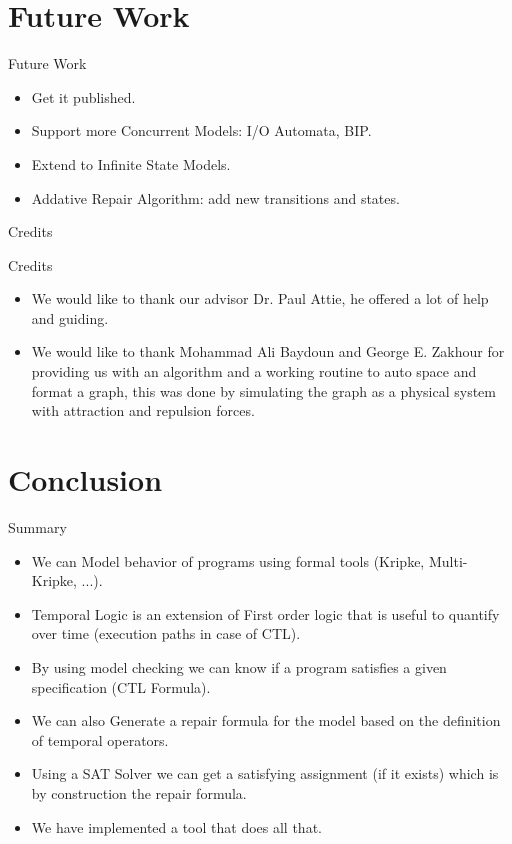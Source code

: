 \documentclass{bredelebeamer}
\begin{document}
\section{Future Work} %

\begin{frame}{Future Work}
\vspace{-5mm}
\hspace{-5mm}
\begin{itemize}
\item Get it published.
\item Support more Concurrent Models: I/O Automata, BIP.
\item Extend to Infinite State Models.
\item Addative Repair Algorithm: add new transitions and states.
\end{itemize}
\end{frame}

\begin{frame}{Credits}
\begin{block}{Credits}
\begin{itemize}
\item We would like to thank our advisor Dr. Paul Attie, he offered a lot of help and guiding.
\item We would like to thank Mohammad Ali Baydoun and George E. Zakhour for providing us with an algorithm 
and a working routine to auto space and format a graph, this was done by simulating the graph as a physical 
system with attraction and repulsion forces.
\end{itemize}
\end{block}
\end{frame}

\section{Conclusion} %

\begin{frame}{Summary}
\vspace{-5mm}
\hspace{-5mm}
\begin{itemize}
\item We can Model behavior of programs using formal tools (Kripke, Multi-Kripke, ...).
\item Temporal Logic is an extension of First order logic that is useful to quantify over time (execution paths in case of CTL).
\item By using model checking we can know if a program satisfies a given specification (CTL Formula).
\item We can also Generate a repair formula for the model based on the definition of temporal operators.
\item Using a SAT Solver we can get a satisfying assignment (if it exists) which is by construction the repair formula.
\item We have implemented a tool that does all that.
\end{itemize}
\end{frame}
\end{document}

